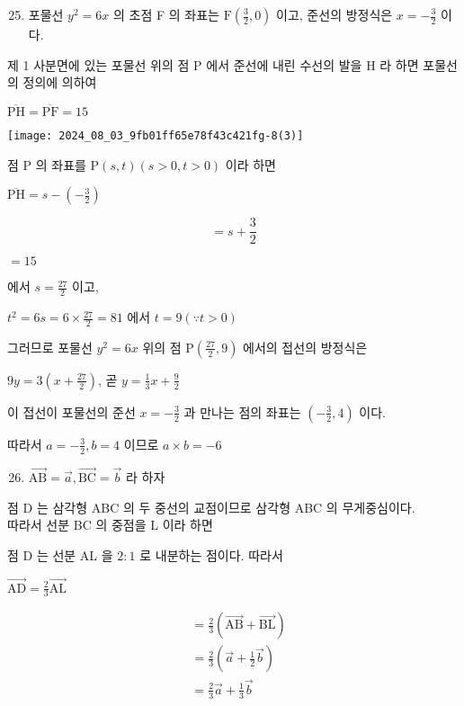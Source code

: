 \documentclass[10pt]{article}
\begin{document}
\begin{enumerate}
  \setcounter{enumi}{24}
  \item 포물선 \(y^{2}=6 x\) 의 초점 F 의 좌표는 \(\mathrm{F}\left(\frac{3}{2}, 0\right)\) 이고, 준선의 방정식은 \(x=-\frac{3}{2}\) 이다.
\end{enumerate}

제 1 사분면에 있는 포물선 위의 점 P 에서 준선에 내린 수선의 발을 H 라 하면 포물선의 정의에 의하여

\(\overline{\mathrm{PH}}=\overline{\mathrm{PF}}=15\)

\begin{center}
\texttt{[image: 2024\_08\_03\_9fb01ff65e78f43c421fg-8(3)]}
\end{center}

점 P 의 좌표를 \(\mathrm{P}(s, t)(s>0, t>0)\) 이라 하면

\(\overline{\mathrm{PH}}=s-\left(-\frac{3}{2}\right)\)

\[
=s+\frac{3}{2}
\]

\(=15\)

에서 \(s=\frac{27}{2}\) 이고,

\(t^{2}=6 s=6 \times \frac{27}{2}=81\) 에서 \(t=9(\because t>0)\)

그러므로 포물선 \(y^{2}=6 x\) 위의 점 \(\mathrm{P}\left(\frac{27}{2}, 9\right)\) 에서의 접선의 방정식은

\(9 y=3\left(x+\frac{27}{2}\right)\), 곧 \(y=\frac{1}{3} x+\frac{9}{2}\)

이 접선이 포물선의 준선 \(x=-\frac{3}{2}\) 과 만나는 점의 좌표는 \(\left(-\frac{3}{2}, 4\right)\) 이다.

따라서 \(a=-\frac{3}{2}, b=4\) 이므로 \(a \times b=-6\)

\begin{enumerate}
  \setcounter{enumi}{25}
  \item \(\overrightarrow{\mathrm{AB}}=\vec{a}, \overrightarrow{\mathrm{BC}}=\vec{b}\) 라 하자
\end{enumerate}

점 D 는 삼각형 ABC 의 두 중선의 교점이므로 삼각형 ABC 의 무게중심이다.\\
따라서 선분 BC 의 중점을 L 이라 하면

점 D 는 선분 AL 을 \(2: 1\) 로 내분하는 점이다. 따라서

\(\overrightarrow{\mathrm{AD}}=\frac{2}{3} \overrightarrow{\mathrm{AL}}\)

\[
\begin{aligned}
& =\frac{2}{3}(\overrightarrow{\mathrm{AB}}+\overrightarrow{\mathrm{BL}}) \\
& =\frac{2}{3}\left(\vec{a}+\frac{1}{2} \vec{b}\right) \\
& =\frac{2}{3} \vec{a}+\frac{1}{3} \vec{b}
\end{aligned}
\]
\end{document}
